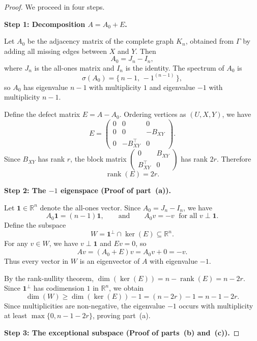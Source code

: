 \documentclass[11pt]{amsart}
\begin{document}
\begin{proof}
We proceed in four steps.

\medskip
\noindent\textbf{Step 1: Decomposition $A = A_0 + E$.}

Let $A_0$ be the adjacency matrix of the complete graph $K_n$, obtained from $\Gamma$ by adding all missing edges between $X$ and $Y$. Then
\[
A_0 = J_n - I_n,
\]
where $J_n$ is the all-ones matrix and $I_n$ is the identity. The spectrum of $A_0$ is
\[
\sigma(A_0) = \{\,n-1,\, -1^{(n-1)}\,\},
\]
so $A_0$ has eigenvalue $n-1$ with multiplicity $1$ and eigenvalue $-1$ with multiplicity $n-1$.

Define the defect matrix $E = A - A_0$. Ordering vertices as $(U,X,Y)$, we have
\[
E =
\begin{pmatrix}
0 & 0 & 0 \\
0 & 0 & -B_{XY} \\
0 & -B_{XY}^\top & 0
\end{pmatrix}.
\]
Since $B_{XY}$ has rank $r$, the block matrix $\begin{pmatrix} 0 & B_{XY} \\ B_{XY}^\top & 0 \end{pmatrix}$ has rank $2r$. Therefore
\[
\operatorname{rank}(E) = 2r.
\]

\medskip
\noindent\textbf{Step 2: The $-1$ eigenspace (Proof of part~\textup{(a)}).}

Let $\mathbf{1}\in\mathbb{R}^n$ denote the all-ones vector. Since $A_0 = J_n - I_n$, we have
\[
A_0 \mathbf{1} = (n-1)\mathbf{1}, \qquad \text{and} \qquad A_0 v = -v \;\text{ for all } v \perp \mathbf{1}.
\]
Define the subspace
\[
W = \mathbf{1}^\perp \cap \ker(E) \subseteq \mathbb{R}^n.
\]
For any $v \in W$, we have $v \perp \mathbf{1}$ and $Ev = 0$, so
\[
Av = (A_0 + E)v = A_0 v + 0 = -v.
\]
Thus every vector in $W$ is an eigenvector of $A$ with eigenvalue $-1$.

By the rank-nullity theorem, $\dim(\ker(E)) = n - \operatorname{rank}(E) = n - 2r$. Since $\mathbf{1}^\perp$ has codimension $1$ in $\mathbb{R}^n$, we obtain
\[
\dim(W) \geq \dim(\ker(E)) - 1 = (n - 2r) - 1 = n - 1 - 2r.
\]
Since multiplicities are non-negative, the eigenvalue $-1$ occurs with multiplicity at least $\max\{0, n - 1 - 2r\}$, proving part~\textup{(a)}.

\medskip
\noindent\textbf{Step 3: The exceptional subspace (Proof of parts~\textup{(b)} and~\textup{(c)}).}


\end{proof}
\end{document}
